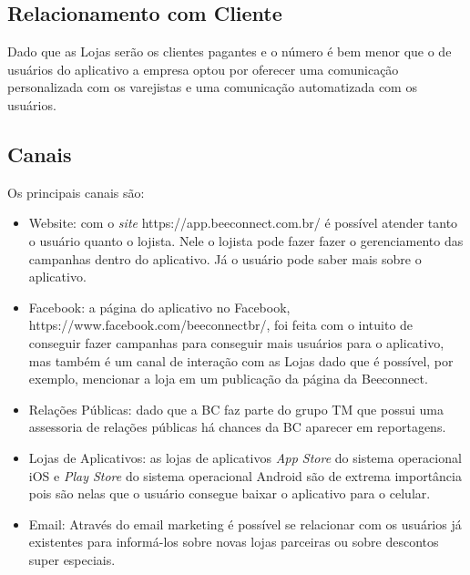 \subsection{Relacionamento com Cliente}
\label{cha:relacionamento_com_cliente}
Dado que as Lojas serão os clientes pagantes e o número é bem menor que o de usuários do aplicativo a empresa optou por oferecer uma comunicação personalizada com os varejistas e uma comunicação automatizada com os usuários. 

\subsection{Canais}
\label{cha:canais}
Os principais canais são:
\begin{itemize}
\item Website: com o \textit{site} https://app.beeconnect.com.br/ é possível atender tanto o usuário quanto o lojista. Nele o lojista pode fazer fazer o gerenciamento das campanhas dentro do aplicativo. Já o usuário pode saber mais sobre o aplicativo.
\item Facebook: a página do aplicativo no Facebook, https://www.facebook.com/beeconnectbr/, foi feita com o intuito de conseguir fazer campanhas para conseguir mais usuários para o aplicativo, mas também é um canal de interação com as Lojas dado que é possível, por exemplo, mencionar a loja em um publicação da página da Beeconnect.
\item Relações Públicas: dado que a BC faz parte do grupo TM que possui uma assessoria de relações públicas há chances da BC aparecer em reportagens.
\item Lojas de Aplicativos: as lojas de aplicativos \textit{App Store} do sistema operacional iOS e \textit{Play Store} do sistema operacional Android são de extrema importância pois são nelas que o usuário consegue baixar o aplicativo para o celular. 
\item Email: Através do email marketing é possível se relacionar com os usuários já existentes para informá-los sobre novas lojas parceiras ou sobre descontos super especiais.
\end{itemize}

